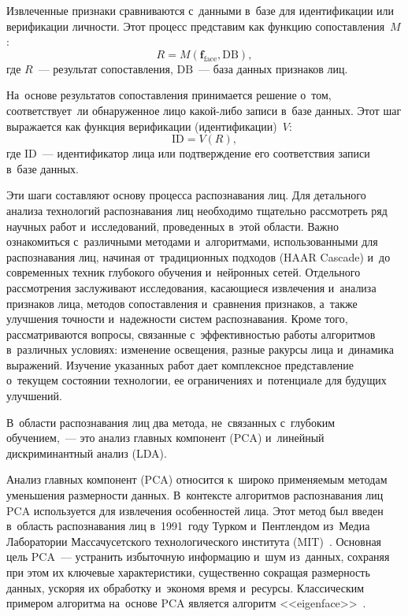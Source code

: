 Извлеченные признаки сравниваются с~данными в~базе для идентификации
или верификации личности. Этот процесс представим как функцию
сопоставления~$M$:
\begin{equation}\label{eq:ch1/match}
    R=M(\mathbf{f}_{\text{face}},\mathrm{DB}),
\end{equation}
где $R$~--- результат сопоставления, $\mathrm{DB}$~--- база данных
признаков лиц.

На~основе результатов сопоставления принимается решение о~том,
соответствует~ли обнаруженное лицо какой-либо записи в~базе данных.
Этот шаг выражается как функция верификации (идентификации)~$V$:
\begin{equation}\label{eq:ch1/verify}
    \mathrm{ID}=V(R),
\end{equation}
где $\mathrm{ID}$~--- идентификатор лица или подтверждение его
соответствия записи в~базе данных.

Эти шаги составляют основу процесса распознавания лиц. Для детального
анализа технологий распознавания лиц необходимо
тщательно рассмотреть ряд научных работ и~исследований, проведенных
в~этой области. Важно ознакомиться с~различными методами и~алгоритмами,
использованными для распознавания лиц, начиная от~традиционных подходов
(HAAR Cascade) и~до современных техник глубокого обучения и~нейронных
сетей. Отдельного рассмотрения заслуживают исследования, касающиеся
извлечения и~анализа признаков лица, методов сопоставления и~сравнения
признаков, а~также улучшения точности и~надежности систем распознавания.
Кроме того, рассматриваются вопросы, связанные с~эффективностью работы
алгоритмов в~различных условиях: изменение освещения, разные ракурсы
лица и~динамика выражений. Изучение указанных работ дает комплексное
представление о~текущем состоянии технологии, ее ограничениях
и~потенциале для будущих улучшений.

В~области распознавания лиц два метода, не~связанных с~глубоким
обучением,~--- это анализ главных компонент (PCA) и~линейный
дискриминантный анализ (LDA).

Анализ главных компонент (PCA) относится к~широко применяемым
методам уменьшения размерности данных. В~контексте алгоритмов
распознавания лиц PCA используется для извлечения особенностей лица.
Этот метод был введен в~область распознавания лиц в~1991~году Турком
и~Пентлендом из~Медиа Лаборатории Массачусетского технологического
института (MIT)~\cite{Turk1991eigenfaces}. Основная цель PCA~--- устранить
избыточную информацию и~шум из~данных, сохраняя при этом их ключевые
характеристики, существенно сокращая размерность данных, ускоряя их
обработку и~экономя время и~ресурсы. Классическим примером алгоритма
на~основе PCA является алгоритм <<eigenface>>~\cite{Gottumukkal2004modularpca,Li2009facePCALDA}.

